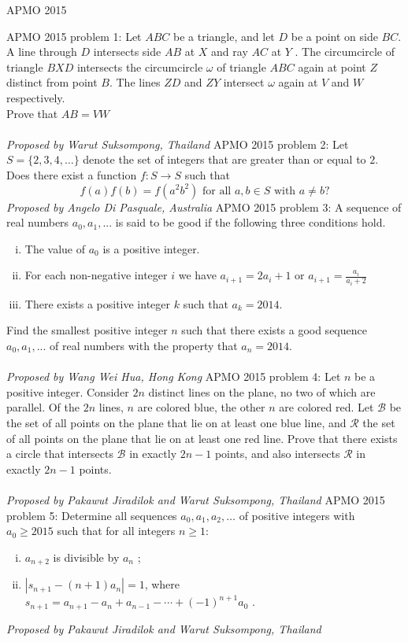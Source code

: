 APMO 2015 

APMO 2015 problem 1:  Let $ABC$ be a triangle, and let $D$ be a point on side $BC$. A line through $D$ intersects side $AB$ at $X$ and ray $AC$ at $Y$ . The circumcircle of triangle $BXD$ intersects the circumcircle $\omega$ of triangle $ABC$ again at point $Z$ distinct from point $B$. The lines $ZD$ and $ZY$ intersect $\omega$ again at $V$ and $W$ respectively. \\
Prove that $AB = V W$ \\\\
\textit{Proposed by Warut Suksompong, Thailand} 
APMO 2015 problem 2:  Let $S = \{2, 3, 4, \ldots\}$ denote the set of integers that are greater than or equal to $2$. Does there exist a function $f : S \to S$ such that
\[ f (a)f (b) = f (a^2 b^2 )\text{ for all }a, b \in S\text{ with }a \ne b? \]
\textit{Proposed by Angelo Di Pasquale, Australia} 
APMO 2015 problem 3:  A sequence of real numbers $a_0, a_1, . . .$ is said to be good if the following three conditions hold.
\begin{enumerate}[(i)]
  \item The value of $a_0$ is a positive integer.
  \item For each non-negative integer $i$ we have $a_{i+1} = 2a_i + 1 $ or $a_{i+1} =\frac{a_i}{a_i + 2} $
  \item There exists a positive integer $k$ such that $a_k = 2014$.
\end{enumerate}
Find the smallest positive integer $n$ such that there exists a good sequence $a_0, a_1, . . .$ of real numbers with the property that $a_n = 2014$. \\\\
\textit{Proposed by Wang Wei Hua, Hong Kong} 
APMO 2015 problem 4:  Let $n$ be a positive integer. Consider $2n$ distinct lines on the plane, no two of which are parallel. Of the $2n$ lines, $n$ are colored blue, the other $n$ are colored red. Let $\mathcal{B}$ be the set of all points on the plane that lie on at least one blue line, and $\mathcal{R}$ the set of all points on the plane that lie on at least one red line. Prove that there exists a circle that intersects $\mathcal{B}$ in exactly $2n - 1$ points, and also intersects $\mathcal{R}$ in exactly $2n - 1$ points. \\\\
\textit{Proposed by Pakawut Jiradilok and Warut Suksompong, Thailand} 
APMO 2015 problem 5:  Determine all sequences $a_0 , a_1 , a_2 , \ldots$ of positive integers with $a_0 \ge 2015$ such that for all integers $n\ge 1$:
\begin{enumerate}[(i)]
  \item $a_{n+2}$ is divisible by $a_n$ ;
  \item $|s_{n+1} - (n + 1)a_n | = 1$, where $s_{n+1} = a_{n+1} - a_n + a_{n-1} - \cdots + (-1)^{n+1} a_0$ .
\end{enumerate}
\textit{Proposed by Pakawut Jiradilok and Warut Suksompong, Thailand} 

